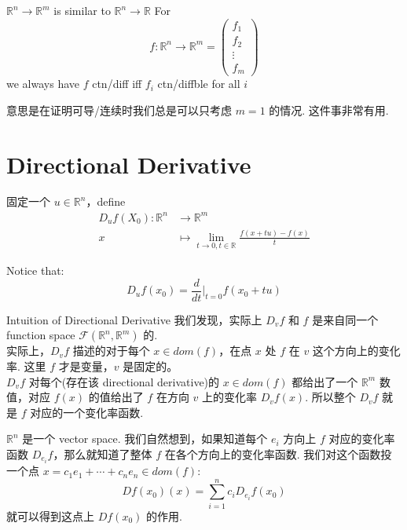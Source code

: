 \documentclass[lang=cn,11pt]{elegantbook}
\begin{document}
\begin{theorem}{$\mathbb{R}^n \rightarrow \mathbb{R}^m$ is similar to $\mathbb{R}^n \rightarrow \mathbb{R}$} \label{$f$ ctn/diff iff $f_i$ ctn/diffble for all $i$}
    For $$f: \mathbb{R}^n \rightarrow \mathbb{R}^m = \begin{pmatrix}
        f_1 \\ f_2 \\ \vdots \\ f_m
    \end{pmatrix}
    $$ we always have
    $f$ ctn/diff iff $f_i$ ctn/diffble for all $i$
\end{theorem}
意思是在证明可导/连续时我们总是可以只考虑 $m=1$ 的情况. 这件事非常有用.

\section{Directional Derivative}
\begin{definition}
    固定一个 $u \in \mathbb{R}^n$，define 
    \begin{align}
        D_u f(X_0) : \mathbb{R}^n & \rightarrow \mathbb{R}^m\\
        x & \mapsto \lim_{t\rightarrow 0, t\in \mathbb{R}} \frac{f(x + tu) - f(x)}{t}
    \end{align}

        Notice that:
        $$
        D_u f(x_0) = \frac{d}{dt}\bigg| _{t=0} f(x_0 + tu)
        $$
\end{definition}


\begin{proposition}{Intuition of Directional Derivative}
我们发现，实际上 $D_v f$ 和 $f$ 是来自同一个 function space $\mathcal{F}(\mathbb{R}^n, \mathbb{R}^m)$ 的.\\
实际上，$D_v f$ 描述的对于每个 $x \in dom(f)$，在点 $x$ 处 $f$ 在 $v$ 这个方向上的变化率. 这里 $f$ 才是变量，$v$ 是固定的。\\
$D_v f$ 对每个(存在该 directional derivative)的 $x \in dom(f)$ 都给出了一个 $\mathbb{R}^m$ 数值，对应 $f(x)$ 的值给出了 $f$ 在方向 $v$ 上的变化率 $D_v f(x)$. 所以整个 $D_v f$ 就是 $f$ 对应的一个变化率函数.
\end{proposition}

\begin{remark}
    $\mathbb{R}^n$ 是一个 vector space. 我们自然想到，如果知道每个 $e_i$ 方向上 $f$ 对应的变化率函数 $D_{e_i} f$，那么就知道了整体 $f$ 在各个方向上的变化率函数. 我们对这个函数投一个点 $x = c_1 e_1 + \cdots + c_n e_n \in dom(f)$:
    $$
    Df(x_0)(x) = \sum_{i=1}^n c_i D_{e_i} f(x_0) 
    $$
    就可以得到这点上 $Df(x_0)$ 的作用.
\end{remark}
\end{document}

